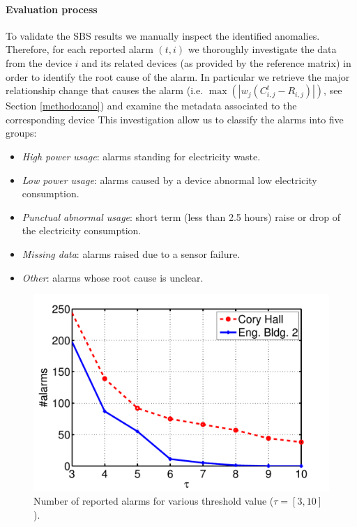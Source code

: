 \paragraph{Evaluation process}
To validate the SBS results we manually inspect the identified anomalies.
Therefore, for each reported alarm $(t,i)$ we thoroughly investigate the data from the device $i$ and its related devices (as provided by the reference matrix) in order to identify the root cause of the alarm.
In particular we retrieve the major relationship change that causes the alarm (i.e. $\max(|w_j(C_{i,j}^t - R_{i,j})|)$, see Section \ref{methodo:ano}) and examine the metadata associated to the corresponding device
This investigation allow us to classify the alarms into five groups:
\begin{itemize}
 \item \emph{High power usage}: alarms standing for electricity waste.
 \item \emph{Low power usage}: alarms caused by a device abnormal low electricity consumption.
 \item \emph{Punctual abnormal usage}: short term (less than 2.5 hours) raise or drop of the electricity consumption.
 \item \emph{Missing data}: alarms raised due to a sensor failure.
 \item \emph{Other}: alarms whose root cause is unclear.
\end{itemize}


\begin{figure}
\begin{center}
 \includegraphics[width=.49\textwidth]{img/threshold-eps-converted-to.pdf}
 \caption{Number of reported alarms for various threshold value ($\tau=[3,10]$).}
 \label{fig:thres}
 \end{center}
\end{figure}


